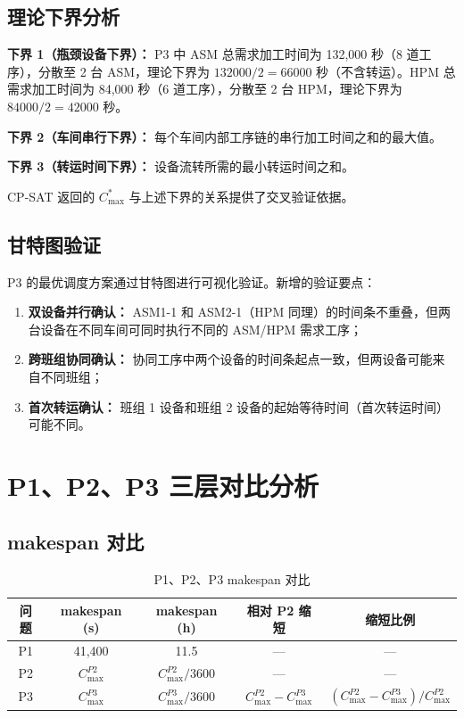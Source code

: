 \documentclass[UTF8,a4paper,12pt]{ctexart}
\begin{document}
\subsection{理论下界分析}
\textbf{下界 1（瓶颈设备下界）：} P3 中 ASM 总需求加工时间为 132,000 秒（8 道工序），分散至 2 台 ASM，理论下界为 $132000 / 2 = 66000$ 秒（不含转运）。HPM 总需求加工时间为 84,000 秒（6 道工序），分散至 2 台 HPM，理论下界为 $84000 / 2 = 42000$ 秒。

\textbf{下界 2（车间串行下界）：} 每个车间内部工序链的串行加工时间之和的最大值。

\textbf{下界 3（转运时间下界）：} 设备流转所需的最小转运时间之和。

CP-SAT 返回的 $C_{\max}^*$ 与上述下界的关系提供了交叉验证依据。

\subsection{甘特图验证}
P3 的最优调度方案通过甘特图进行可视化验证。新增的验证要点：
\begin{enumerate}
  \item \textbf{双设备并行确认：} ASM1-1 和 ASM2-1（HPM 同理）的时间条不重叠，但两台设备在不同车间可同时执行不同的 ASM/HPM 需求工序；
  \item \textbf{跨班组协同确认：} 协同工序中两个设备的时间条起点一致，但两设备可能来自不同班组；
  \item \textbf{首次转运确认：} 班组 1 设备和班组 2 设备的起始等待时间（首次转运时间）可能不同。
\end{enumerate}

\section{P1、P2、P3 三层对比分析}
\subsection{makespan 对比}
\begin{table}[htbp]
  \centering
  \caption{P1、P2、P3 makespan 对比}
  \label{tab:three_makespan}
  \begin{tabular}{ccccc}
    \toprule
    问题 & makespan (s) & makespan (h) & 相对 P2 缩短 & 缩短比例 \\
    \midrule
    P1 & 41,400 & 11.5 & — & — \\
    P2 & $C_{\max}^{P2}$ & $C_{\max}^{P2}/3600$ & — & — \\
    P3 & $C_{\max}^{P3}$ & $C_{\max}^{P3}/3600$ & $C_{\max}^{P2} - C_{\max}^{P3}$ & $(C_{\max}^{P2} - C_{\max}^{P3})/C_{\max}^{P2}$ \\
    \bottomrule
  \end{tabular}
\end{table}
\end{document}
